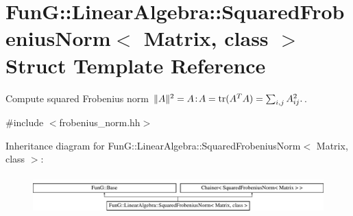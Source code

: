 \hypertarget{structFunG_1_1LinearAlgebra_1_1SquaredFrobeniusNorm}{\section{Fun\-G\-:\-:Linear\-Algebra\-:\-:Squared\-Frobenius\-Norm$<$ Matrix, class $>$ Struct Template Reference}
\label{structFunG_1_1LinearAlgebra_1_1SquaredFrobeniusNorm}
}


Compute squared Frobenius norm $ \|A\|^2 = A\negthinspace : \negthinspace A = \mathrm{tr}(A^TA) = \sum_{i,j} A_{ij}^2. $.  




{\ttfamily \#include $<$frobenius\-\_\-norm.\-hh$>$}

Inheritance diagram for Fun\-G\-:\-:Linear\-Algebra\-:\-:Squared\-Frobenius\-Norm$<$ Matrix, class $>$\-:\begin{figure}[H]
\begin{center}
\leavevmode
\includegraphics[height=1.493333cm]{structFunG_1_1LinearAlgebra_1_1SquaredFrobeniusNorm}
\end{center}
\end{figure}
